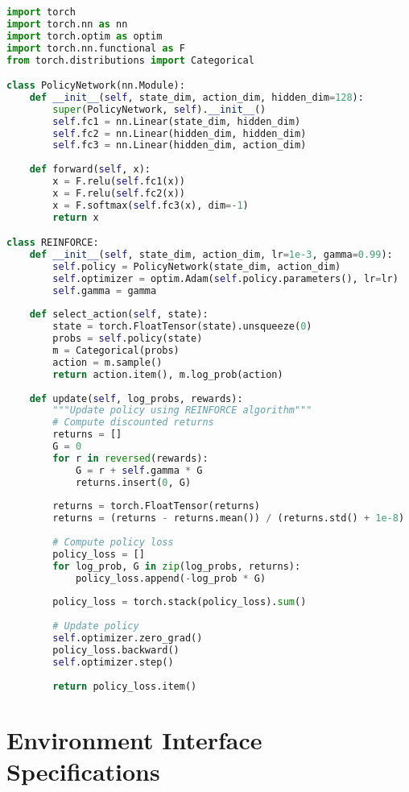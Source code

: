 \begin{lstlisting}[language=Python, caption=REINFORCE Implementation]
import torch
import torch.nn as nn
import torch.optim as optim
import torch.nn.functional as F
from torch.distributions import Categorical

class PolicyNetwork(nn.Module):
    def __init__(self, state_dim, action_dim, hidden_dim=128):
        super(PolicyNetwork, self).__init__()
        self.fc1 = nn.Linear(state_dim, hidden_dim)
        self.fc2 = nn.Linear(hidden_dim, hidden_dim)
        self.fc3 = nn.Linear(hidden_dim, action_dim)
    
    def forward(self, x):
        x = F.relu(self.fc1(x))
        x = F.relu(self.fc2(x))
        x = F.softmax(self.fc3(x), dim=-1)
        return x

class REINFORCE:
    def __init__(self, state_dim, action_dim, lr=1e-3, gamma=0.99):
        self.policy = PolicyNetwork(state_dim, action_dim)
        self.optimizer = optim.Adam(self.policy.parameters(), lr=lr)
        self.gamma = gamma
        
    def select_action(self, state):
        state = torch.FloatTensor(state).unsqueeze(0)
        probs = self.policy(state)
        m = Categorical(probs)
        action = m.sample()
        return action.item(), m.log_prob(action)
    
    def update(self, log_probs, rewards):
        """Update policy using REINFORCE algorithm"""
        # Compute discounted returns
        returns = []
        G = 0
        for r in reversed(rewards):
            G = r + self.gamma * G
            returns.insert(0, G)
        
        returns = torch.FloatTensor(returns)
        returns = (returns - returns.mean()) / (returns.std() + 1e-8)
        
        # Compute policy loss
        policy_loss = []
        for log_prob, G in zip(log_probs, returns):
            policy_loss.append(-log_prob * G)
        
        policy_loss = torch.stack(policy_loss).sum()
        
        # Update policy
        self.optimizer.zero_grad()
        policy_loss.backward()
        self.optimizer.step()
        
        return policy_loss.item()
\end{lstlisting}

\section{Environment Interface Specifications}

